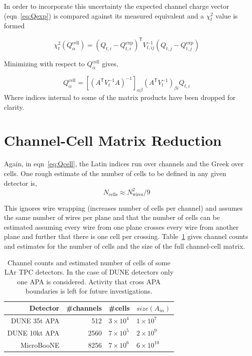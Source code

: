 \documentclass[letter]{article}
\def\mQdec{Q_{t,i}}
\def\mQexp{Q^{\mathrm{exp}}_{t,i}}
\def\mVcov{V_{t,ij}}
\def\mAchc{A_{i\alpha}}
\def\mQcell{Q^{\mathrm{cell}}_\alpha}
\def\Qcell{$\mQcell$\xspace}
\begin{document}
In order to incorporate this uncertainty the expected channel charge
vector (eqn~\ref{eq:Qexp}) is compared against its measured equivalent and 
a $\chi^2_t$ value is formed

\begin{equation}
  \label{eq:chi2}
  \chi^2_t(\mQcell) = (\mQdec - \mQexp)^\mathsf{T}\mVcov^{-1}(Q_{t,j} - Q^{\mathrm{exp}}_{t,j})
\end{equation}

\noindent Minimizing with respect to \Qcell gives,

\begin{equation}
  \label{eq:Qcell}
  \mQcell = [(A^\mathsf{T}V_t^{-1}A)^{-1}]_{\alpha\beta}
  (A^\mathsf{T}V_t^{-1})_{\beta i}\mQdec
\end{equation}
Where indices internal to some of the matrix products have been
dropped for clarity.

\section{Channel-Cell Matrix Reduction}
\label{sec:reduction}

Again, in eqn~\ref{eq:Qcell}, the Latin indices run over
channels and the Greek over cells.
One rough estimate of the number of cells to be defined in any given
detector is,
\begin{equation}
  \label{eq:ncellsestimate}
  N_\mathrm{cells} \approx N_\mathrm{wires}^2/9
\end{equation}

This ignores wire wrapping (increases number of cells per channel) and
assumes the same number of wires per plane and that the number of
cells can be estimated assuming every wire from one plane crosses
every wire from another plane and further that there is one cell per
crossing.
Table~\ref{tab:detectorcounts} gives channel counts and estimates for the
number of cells and the size of the full channel-cell matrix.

\begin{table}[htbp]
  \centering
  \begin{tabular}[h]{|r|r|l|l|}
    \hline
    Detector & \#channels & \#cells & $size(\mAchc)$ \\
    \hline
    \hline
    DUNE 35t APA & 512 & $3\times 10^4$ & $1\times 10^7$\\
    DUNE 10kt APA & 2560 & $7\times 10^5$ & $2\times 10^9$ \\
    MicroBooNE & 8256 & $7\times 10^6$ & $6\times 10^{10}$\\
    \hline
  \end{tabular}
  \caption{Channel counts and estimated number of cells of some LAr
    TPC detectors.
    In the case of DUNE detectors only one APA is considered.
    Activity that cross APA boundaries is left for future investigations.}
  \label{tab:detectorcounts}
\end{table}
\end{document}
